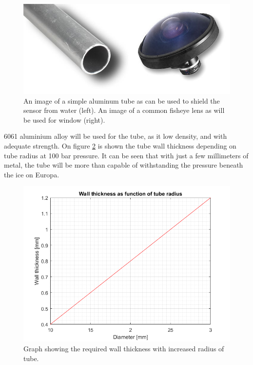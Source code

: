 \begin{figure}[htb]
\begin{center}
\includegraphics[scale=0.8]{figures/RCS/tube_fisheye}
\caption{An image of a simple aluminum tube as can be used to shield the sensor from water (left). An image of a common fisheye lens as will be used for window (right).}
\label{fig:tube}
\end{center}
\end{figure}

6061 aluminium alloy will be used for the tube, as it low density, and with adequate strength. On figure \ref{fig:wall_thick} is shown the tube wall thickness depending on tube radius at 100 bar pressure. It can be seen that with just a few millimeters of metal, the tube will be more than capable of withstanding the pressure beneath the ice on Europa.

\begin{figure}[htb]
\begin{center}
\includegraphics[scale=0.8]{figures/RCS/Wall_thickness_graph}
\caption{Graph showing the required wall thickness with increased radius of tube.}
\label{fig:wall_thick}
\end{center}
\end{figure}

